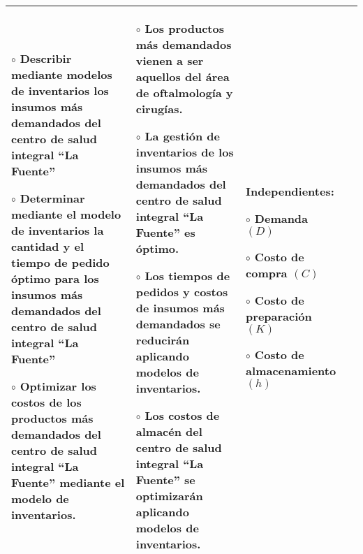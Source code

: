 \begin{landscape}
\begin{table}[h!]
\begin{tabular}{|>{\raggedright\arraybackslash}m{6.3cm}|>{\raggedright\arraybackslash}m{6.3cm}|>{\raggedright\arraybackslash}m{6.3cm}|>{\raggedright\arraybackslash}m{2.9cm}|}
        {\footnotesize $\circ$ Clasificar los productos más demandados del centro de salud integral La Fuente aplicando el principio de Pareto o análisis ABC.}\vspace{0.3cm}

            {\footnotesize $\circ$ Describir mediante modelos de inventarios los insumos más demandados del centro de salud integral ``La Fuente''}\vspace{0.3cm}

            {\footnotesize $\circ$ Determinar mediante el modelo de inventarios la cantidad y el tiempo de pedido óptimo para los insumos más demandados del centro de salud integral ``La Fuente''}\vspace{0.3cm}

            {\footnotesize $\circ$ Optimizar los costos de los productos más demandados del centro de salud integral ``La Fuente'' mediante el modelo de inventarios.} & 

        {\footnotesize $\circ$ Los productos más demandados vienen a ser aquellos del área de oftalmología y cirugías.}\vspace{0.3cm}

            {\footnotesize $\circ$ La gestión de inventarios de los insumos más demandados del centro de salud integral ``La Fuente'' es óptimo.}\vspace{0.3cm}

            {\footnotesize $\circ$ Los tiempos de pedidos y costos de insumos más demandados se reducirán aplicando modelos de inventarios.}\vspace{0.3cm}

            {\footnotesize $\circ$ Los costos de almacén del centro de salud integral ``La Fuente'' se optimizarán aplicando modelos de inventarios.} & 
        {\footnotesize \textbf{Independientes:}}\vspace{0.3cm}

        {\footnotesize $\circ$ Demanda $(D)$}\vspace{0.3cm}

        $\circ$ Costo de compra $(C)$\vspace{0.3cm}

        $\circ$ Costo de preparación $(K)$\vspace{0.3cm}

        $\circ$ Costo de almacenamiento $(h)$} \\
        \hline
    \end{tabular}
\end{table}
\end{landscape} %